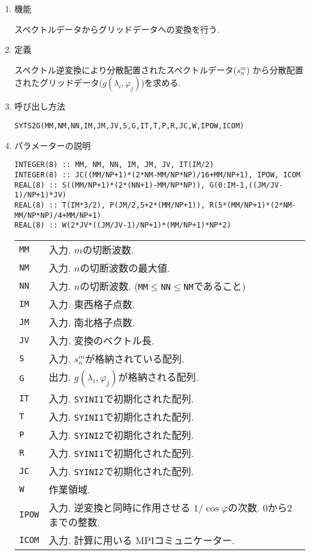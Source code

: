 \documentclass[a4j]{jsarticle}
\begin{document}
\begin{enumerate}

\item 機能 

スペクトルデータからグリッドデータへの変換を行う.

\item 定義

スペクトル逆変換により分散配置されたスペクトルデータ($s^m_n$)
から分散配置されたグリッドデータ($g(\lambda_i,\varphi_j)$)を求める.

\item 呼び出し方法 

\texttt{SYTS2G(MM,NM,NN,IM,JM,JV,S,G,IT,T,P,R,JC,W,IPOW,ICOM)}
  
\item パラメーターの説明

\begin{verbatim}        
INTEGER(8) :: MM, NM, NN, IM, JM, JV, IT(IM/2)
INTEGER(8) :: JC((MM/NP+1)*(2*NM-MM/NP*NP)/16+MM/NP+1), IPOW, ICOM
REAL(8) :: S((MM/NP+1)*(2*(NN+1)-MM/NP*NP)), G(0:IM-1,((JM/JV-1)/NP+1)*JV)
REAL(8) :: T(IM*3/2), P(JM/2,5+2*(MM/NP+1)), R(5*(MM/NP+1)*(2*NM-MM/NP*NP)/4+MM/NP+1)
REAL(8) :: W(2*JV*((JM/JV-1)/NP+1)*(MM/NP+1)*NP*2)
\end{verbatim}      

\begin{tabular}{ll}
\texttt{MM} & 入力. $m$の切断波数.\\
\texttt{NM} & 入力. $n$の切断波数の最大値.\\
\texttt{NN} & 入力. $n$の切断波数.
(\texttt{MM}$\le$\texttt{NN}$\le$\texttt{NM}であること)\\
\texttt{IM} & 入力. 東西格子点数.\\
\texttt{JM} & 入力. 南北格子点数.\\
\texttt{JV} & 入力. 変換のベクトル長.\\
\texttt{S} & 入力. $s^m_n$が格納されている配列.\\
\texttt{G} & 出力. $g(\lambda_i,\varphi_j)$が格納される配列.\\
\texttt{IT} & 入力. \texttt{SYINI1}で初期化された配列.\\
\texttt{T} & 入力. \texttt{SYINI1}で初期化された配列.\\
\texttt{P}  & 入力. \texttt{SYINI2}で初期化された配列.\\
\texttt{R}  & 入力. \texttt{SYINI1}で初期化された配列.\\
\texttt{JC}  & 入力. \texttt{SYINI2}で初期化された配列.\\
\texttt{W} & 作業領域.\\
\texttt{IPOW} & 入力. 逆変換と同時に作用させる
                      $1/\cos\varphi$の次数. 0から2までの整数.\\
\texttt{ICOM} & 入力. 計算に用いる MPIコミュニケーター.
\end{tabular}


\end{enumerate}
\end{document}
